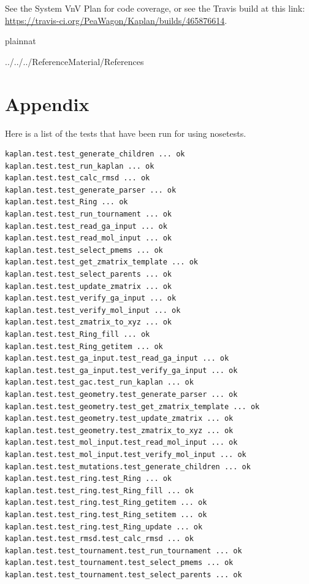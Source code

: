\documentclass[12pt, titlepage]{article}
\begin{document}
See the System VnV Plan for code coverage, or see the Travis build at this 
link: \url{https://travis-ci.org/PeaWagon/Kaplan/builds/465876614}.

 {plainnat}

 {../../../ReferenceMaterial/References}

\section{Appendix}\label{report-appendix}

Here is a list of the tests that have been run for \progname{} using nosetests.

\begin{lstlisting}
kaplan.test.test_generate_children ... ok
kaplan.test.test_run_kaplan ... ok
kaplan.test.test_calc_rmsd ... ok
kaplan.test.test_generate_parser ... ok
kaplan.test.test_Ring ... ok
kaplan.test.test_run_tournament ... ok
kaplan.test.test_read_ga_input ... ok
kaplan.test.test_read_mol_input ... ok
kaplan.test.test_select_pmems ... ok
kaplan.test.test_get_zmatrix_template ... ok
kaplan.test.test_select_parents ... ok
kaplan.test.test_update_zmatrix ... ok
kaplan.test.test_verify_ga_input ... ok
kaplan.test.test_verify_mol_input ... ok
kaplan.test.test_zmatrix_to_xyz ... ok
kaplan.test.test_Ring_fill ... ok
kaplan.test.test_Ring_getitem ... ok
kaplan.test.test_ga_input.test_read_ga_input ... ok
kaplan.test.test_ga_input.test_verify_ga_input ... ok
kaplan.test.test_gac.test_run_kaplan ... ok
kaplan.test.test_geometry.test_generate_parser ... ok
kaplan.test.test_geometry.test_get_zmatrix_template ... ok
kaplan.test.test_geometry.test_update_zmatrix ... ok
kaplan.test.test_geometry.test_zmatrix_to_xyz ... ok
kaplan.test.test_mol_input.test_read_mol_input ... ok
kaplan.test.test_mol_input.test_verify_mol_input ... ok
kaplan.test.test_mutations.test_generate_children ... ok
kaplan.test.test_ring.test_Ring ... ok
kaplan.test.test_ring.test_Ring_fill ... ok
kaplan.test.test_ring.test_Ring_getitem ... ok
kaplan.test.test_ring.test_Ring_setitem ... ok
kaplan.test.test_ring.test_Ring_update ... ok
kaplan.test.test_rmsd.test_calc_rmsd ... ok
kaplan.test.test_tournament.test_run_tournament ... ok
kaplan.test.test_tournament.test_select_pmems ... ok
kaplan.test.test_tournament.test_select_parents ... ok
\end{lstlisting}
\end{document}
